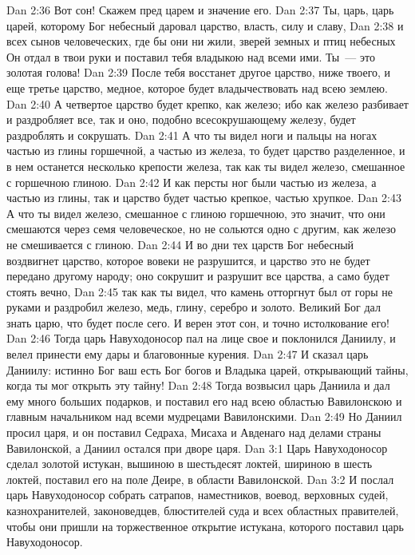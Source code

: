 \vs Dan 2:36 Вот сон! Скажем пред царем и значение его.
\vs Dan 2:37 Ты, царь, царь царей, которому Бог небесный даровал царство, власть, силу и славу,
\vs Dan 2:38 и всех сынов человеческих, где бы они ни жили, зверей земных и птиц небесных Он отдал в твои руки и поставил тебя владыкою над всеми ими. Ты~--- это золотая голова!
\vs Dan 2:39 После тебя восстанет другое царство, ниже твоего, и еще третье царство, медное, которое будет владычествовать над всею землею.
\vs Dan 2:40 А четвертое царство будет крепко, как железо; ибо как железо разбивает и раздробляет все, так и оно, подобно всесокрушающему железу, будет раздроблять и сокрушать.
\vs Dan 2:41 А что ты видел ноги и пальцы на ногах частью из глины горшечной, а частью из железа, то будет царство разделенное, и в нем останется несколько крепости железа, так как ты видел железо, смешанное с горшечною глиною.
\vs Dan 2:42 И как персты ног были частью из железа, а частью из глины, так и царство будет частью крепкое, частью хрупкое.
\vs Dan 2:43 А что ты видел железо, смешанное с глиною горшечною, это значит, что они смешаются через семя человеческое, но не сольются одно с другим, как железо не смешивается с глиною.
\vs Dan 2:44 И во дни тех царств Бог небесный воздвигнет царство, которое вовеки не разрушится, и царство это не будет передано другому народу; оно сокрушит и разрушит все царства, а само будет стоять вечно,
\vs Dan 2:45 так как ты видел, что камень отторгнут был от горы не руками и раздробил железо, медь, глину, серебро и золото. Великий Бог дал знать царю, что будет после сего. И верен этот сон, и точно истолкование его!
\vs Dan 2:46 Тогда царь Навуходоносор пал на лице свое и поклонился Даниилу, и велел принести ему дары и благовонные курения.
\vs Dan 2:47 И сказал царь Даниилу: истинно Бог ваш есть Бог богов и Владыка царей, открывающий тайны, когда ты мог открыть эту тайну!
\vs Dan 2:48 Тогда возвысил царь Даниила и дал ему много больших подарков, и поставил его над всею областью Вавилонскою и главным начальником над всеми мудрецами Вавилонскими.
\vs Dan 2:49 Но Даниил просил царя, и он поставил Седраха, Мисаха и Авденаго над делами страны Вавилонской, а Даниил остался при дворе царя.
\vs Dan 3:1 Царь Навуходоносор сделал золотой истукан, вышиною в шестьдесят локтей, шириною в шесть локтей, поставил его на поле Деире, в области Вавилонской.
\vs Dan 3:2 И послал царь Навуходоносор собрать сатрапов, наместников, воевод, верховных судей, казнохранителей, законоведцев, блюстителей суда и всех областных правителей, чтобы они пришли на торжественное открытие истукана, которого поставил царь Навуходоносор.
